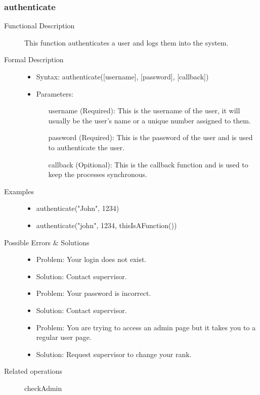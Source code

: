 \documentclass[a4paper]{article}
\begin{document}
\subsubsection{authenticate} 
\begin{description}
\item[Functional Description] This function authenticates a user and logs them into the system.
\item[Formal Description]\hfill
\begin{itemize}
	\item Syntax: authenticate([username], [password], [callback])\\
	\item Parameters:
		\begin{itemize}
			\item [username] (Required): This is the username of the user, it will usually be the user's name or a unique number assigned to them.
			\item [password] (Required): This is the password of the user and is used to authenticate the user.
			\item [callback](Opitional): This is the callback function and is used to keep the processes synchronous.
		\end{itemize}
\end{itemize}
\item[Examples]\hfill
\begin{itemize}
	\item authenticate("John", 1234)
	\item authenticate("john", 1234, thisIsAFunction(){})
\end{itemize}
\item[Possible Errors \&  Solutions]\hfill
	\begin{itemize}
		\item Problem: Your login does not exist.
		\item Solution: Contact supervisor.
		\item Problem: Your password is incorrect.
		\item Solution: Contact supervisor.
		\item Problem: You are trying to access an admin page but it takes you to a regular user page.
		\item Solution: Request supervisor to change your rank.
	\end{itemize}
\item [Related operations]	checkAdmin
\end{description}
\end{document}
